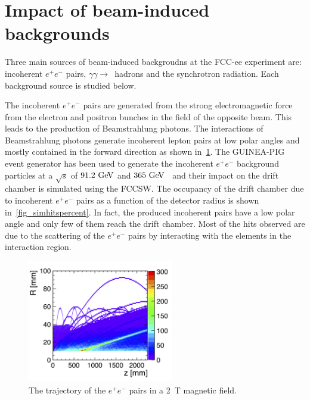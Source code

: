 \documentclass[conference]{IEEEtran}
\begin{document}
\section{Impact of beam-induced backgrounds}
Three main sources of beam-induced backgroudns at the FCC-ee experiment are: incoherent $e^+e^-$ pairs, $\gamma\gamma\rightarrow$~hadrons and the synchrotron radiation. Each background source is studied below.

The incoherent $e^+e^-$ pairs are generated from the strong electromagnetic force from the electron and positron bunches in the field of the opposite beam. This leads to the production of Beamstrahlung photons. The interactions of Beamstrahlung photons generate incoherent lepton pairs at low polar angles and mostly contained in the forward direction as shown in~\cref{fig_pairbcg}. The \textsc{GUINEA-PIG}~\cite{Schulte:382453} event generator has been used to generate the incoherent $e^+e^-$ background particles at a $\sqrt{s}$ of $91.2\,\mathrm{\,Ge\kern -0.1em V}$ and $365\,\mathrm{\,Ge\kern -0.1em V}$~\cite{Voutsinas:2017eca} and their impact on the drift chamber is simulated using the FCCSW. The occupancy of the drift chamber due to incoherent $e^+e^-$ pairs as a function of the detector radius is shown in~\cref{fig_simhitspercent}. In fact, the produced incoherent pairs have a low polar angle and only few of them reach the drift chamber. Most of the hits observed are due to the scattering of the $e^+e^-$ pairs by interacting with the elements in the interaction region.


\begin{figure}[!t]
\centering
\includegraphics[width=2.5in]{figures/pairs_R_Z.png}
\caption{The trajectory of the $e^+e^-$ pairs in a 2~T magnetic field.}
\label{fig_pairbcg}
\end{figure}
\end{document}
